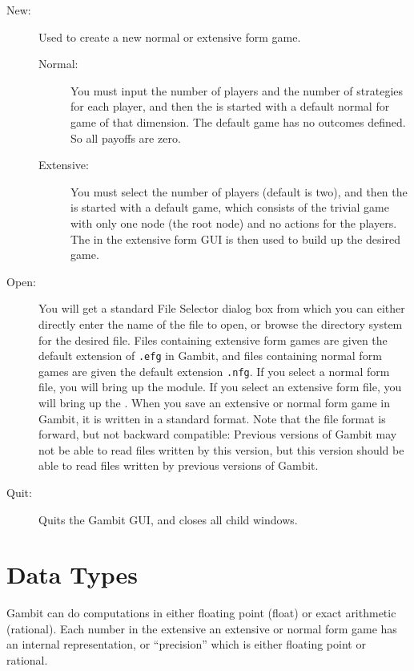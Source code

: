 \documentclass[12pt]{report}
\begin{document}
\begin{description}
\item[New:] Used to create a new normal or extensive form game. 
\begin{description}
\item[Normal:] You must input the number of players and the number of
strategies for each player, and then the  is started with a default normal for game of that
dimension.  The default game has no outcomes defined.  So all payoffs
are zero.
\item[Extensive:] You must select the number of players (default is
two), and then the  is started with
a default game, which consists of the trivial game with only one node
(the root node) and no actions for the players.  The  in the extensive form GUI is then used to build up the
desired game.
\end{description}
\item[Open:] You will get a standard File Selector dialog box from
which you can either directly enter the name of the file to open, or
browse the directory system for the desired file.  Files containing
extensive form games are given the default extension of \verb+.efg+ in
Gambit, and files containing normal form games are given the default
extension \verb+.nfg+. If you select a normal form file, you will
bring up the  module.  If you select
an extensive form file, you will bring up the .  When you save an extensive or normal form game in
Gambit, it is written in a standard format. Note that the file format
is forward, but not backward compatible: Previous versions of Gambit
may not be able to read files written by this version, but this
version should be able to read files written by previous versions of
Gambit.
\item[Quit:] Quits the Gambit GUI, and closes all child windows.  
\end{description}

\section{Data Types}\label{DataTypes}
Gambit can do computations in either floating point (float) or
exact arithmetic (rational).  Each number in the extensive an extensive 
or normal form game has an internal representation, or ``precision'' which is 
either floating point or rational.  
\end{document}
